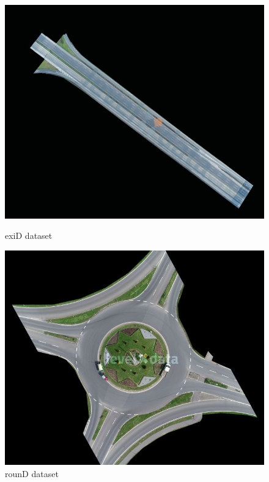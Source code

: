 \begin{figure}[h]
    \centering
    \begin{minipage}[b]{0.45\columnwidth}
        \centering
        \includegraphics[width=\columnwidth]{images/figures/exid_dataset.jpeg}
        \caption{exiD dataset}
        \label{fig:exiD dataset}
    \end{minipage}
    \hfill
    \begin{minipage}[b]{0.45\columnwidth}
        \centering
        \includegraphics[width=\columnwidth]{images/figures/round_dataset.jpeg}
        \caption{rounD dataset}
        \label{fig:rounD dataset}
    \end{minipage}
\end{figure}

